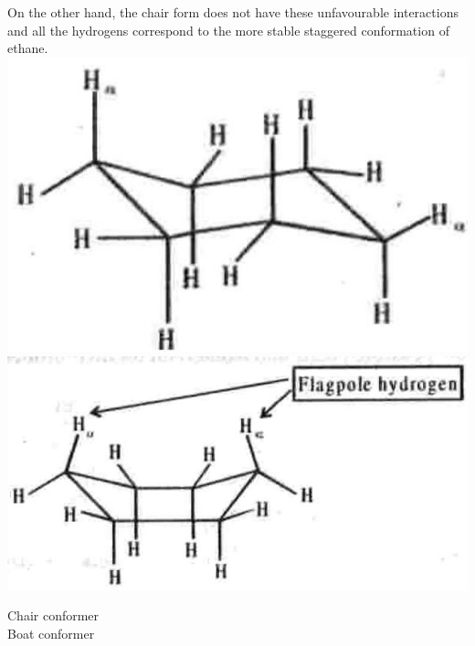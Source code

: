 \documentclass[10pt]{article}
\begin{document}
On the other hand, the chair form does not have these unfavourable interactions and all the hydrogens correspond to the more stable staggered conformation of ethane.\\
\includegraphics[max width=\textwidth, center]{2025_01_28_8470952b98110cec3aabg-061}\\
\includegraphics[max width=\textwidth, center]{2025_01_28_8470952b98110cec3aabg-061(1)}

Chair conformer\\
Boat conformer
\end{document}
